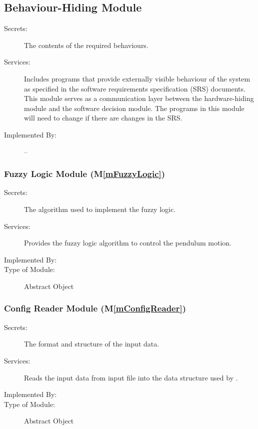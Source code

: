 \documentclass[12pt, titlepage]{article}
\newcommand{\mref}[1]{M\ref{#1}}
\begin{document}
\subsection{Behaviour-Hiding Module}

\begin{description}
\item[Secrets:]The contents of the required behaviours.
\item[Services:]Includes programs that provide externally visible behaviour of
  the system as specified in the software requirements specification (SRS)
  documents. This module serves as a communication layer between the
  hardware-hiding module and the software decision module. The programs in this
  module will need to change if there are changes in the SRS.
\item[Implemented By:] --
\end{description}

\subsubsection{Fuzzy Logic Module (\mref{mFuzzyLogic})}

\begin{description}
\item[Secrets:] The algorithm used to implement the fuzzy logic.
\item[Services:] Provides the fuzzy logic algorithm to control the pendulum motion.
\item[Implemented By:] \progname{}
\item[Type of Module:] Abstract Object
\end{description}

\subsubsection{Config Reader Module (\mref{mConfigReader})}

\begin{description}
\item[Secrets:] The format and structure of the input data.
\item[Services:] Reads the input data from input file into 
                 the data structure used by \progname{}.
\item[Implemented By:] \progname{}
\item[Type of Module:] Abstract Object
\end{description}
\end{document}
